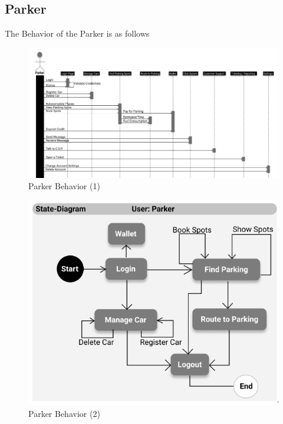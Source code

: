     \subsection{Parker}
        The Behavior of the Parker is as follows
        \begin{figure}[h]
            \centering
            \includegraphics[width=1\textwidth]{images/parkerBehaviour.png}
            \caption{Parker Behavior (1)}
            \label{fig:parkerBehavior}
        \end{figure}


        \begin{figure}[h]
            \centering
            \includegraphics[width=1\textwidth]{images/parkerBehaviour2.png}
            \caption{Parker Behavior (2)}
            \label{fig:parkerBehavior2}
        \end{figure}

